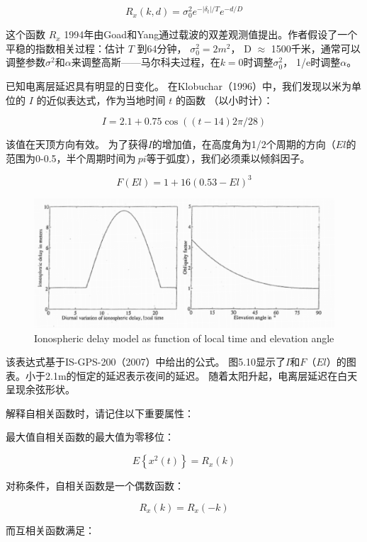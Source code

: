    \begin{equation}\label{5.40}
   R_{x}(k,d)=\sigma_{0}^{2}e^{-|\delta_{t}|/T} e^{-d/D}
   \end{equation}
    
    这个函数 $ R_{x} $ 1994年由Goad和Yang通过载波的双差观测值提出。作者假设了一个平稳的指数相关过程：估计 $ T $ 到64分钟， $ \sigma_{0}^{2}=2m^{2} $， D $ \approx $ 1500千米，通常可以调整参数$ \sigma^{2} $和$ \alpha $来调整高斯——马尔科夫过程，在$ k = 0 $时调整$ \sigma_{0}^{2} $， 1/e时调整$ \alpha $。
    
    已知电离层延迟具有明显的日变化。 在Klobuchar（1996）中，我们发现以米为单位的 $ I $ 的近似表达式，作为当地时间 $ t $ 的函数 （以小时计）：
    
    \[ I=2.1+0.75\cos((t-14)2\pi/28) \]
    
    该值在天顶方向有效。 为了获得$ I $的增加值，在高度角为1/2个周期的方向（$ El $的范围为0-0.5，半个周期时间为$ \ pi $等于弧度），我们必须乘以倾斜因子。
    
     \[ F(El)=1+16(0.53-El)^{3} \]
     
     \begin{figure}[h]
     	\centering
     	\includegraphics[width=0.7\linewidth]{TeX_files/Part02/chapter05/image/9}
     	\caption{Ionospheric delay model as function of local time and elevation angle}
     	\label{ }
     \end{figure}
     
     该表达式基于IS-GPS-200（2007）中给出的公式。 图5.10显示了$ I $和$ F（El）$的图表。小于2.1m的恒定的延迟表示夜间的延迟。 随着太阳升起，电离层延迟在白天呈现余弦形状。
     
     解释自相关函数时，请记住以下重要属性：
     
     最大值自相关函数的最大值为零移位：
     
      \[ E\left\lbrace x^{2}(t)\right\rbrace  = R_{x}(k) \]
      
      对称条件，自相关函数是一个偶数函数：
      
       \[ R_{x}(k) = R_{x}(-k) \]
       
       而互相关函数满足：
       
